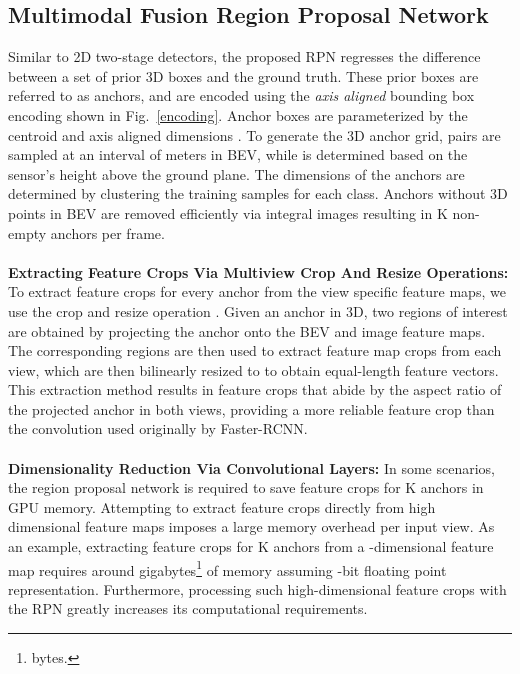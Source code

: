 \documentclass[letterpaper, 10 pt, conference]{ieeeconf}
\newcommand{\fig}[1]{Fig.~\ref{#1}}
\begin{document}
\subsection{Multimodal Fusion Region Proposal Network}
Similar to 2D two-stage detectors, the proposed RPN regresses the difference between a set of prior 3D boxes and the ground truth. These prior boxes are referred to as anchors, and are encoded using the \textit{axis aligned} bounding box encoding shown in \fig{encoding}. Anchor boxes are parameterized by the centroid  and axis aligned dimensions . To generate the 3D anchor grid,  pairs are sampled at an interval of  meters in BEV, while  is determined based on the sensor's height above the ground plane. The dimensions of the anchors are determined by clustering the training samples for each class. Anchors without 3D points in BEV are removed efficiently via integral images resulting in K non-empty anchors per frame.
\\
\\
\textbf{Extracting Feature Crops Via Multiview Crop And Resize Operations:}
To extract feature crops for every anchor from the view specific feature maps, we use the crop and resize operation \cite{Huang_2017_CVPR}. Given an anchor in 3D, two regions of interest are obtained by projecting the anchor onto the BEV and image feature maps. The corresponding regions are then used to extract feature map crops from each view, which are then bilinearly resized to  to obtain equal-length feature vectors. This extraction method results in feature crops that abide by the aspect ratio of the projected anchor in both views, providing a more reliable feature crop than the  convolution used originally by Faster-RCNN.
\\
\\ 
\textbf{Dimensionality Reduction Via  Convolutional Layers:} In some scenarios, the region proposal network is required to save feature crops for K anchors in GPU memory. Attempting to extract feature crops directly from high dimensional feature maps imposes a large memory overhead per input view. As an example, extracting  feature crops for K anchors from a -dimensional feature map requires around  gigabytes\footnote{ bytes.} of memory assuming -bit floating point representation. Furthermore, processing such high-dimensional feature crops with the RPN greatly increases its computational requirements.
\end{document}
